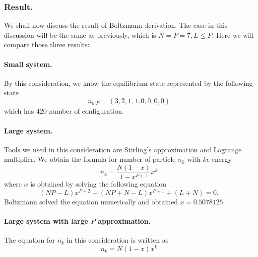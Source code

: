 \documentclass[../../../Main.tex]{subfiles}
\begin{document}
\subsubsection*{Result.} We shall now discuss the result of Boltzmann derivation. The case in this discussion will be the same as previously, which is $N = P = 7 , L \leq P$. Here we will compare those three results: 

\paragraph*{Small system.} By this consideration, we know the equilibrium state represented by the following state \begin{equation*}
    n_{k|P}=(3, 2, 1, 1, 0, 0, 0, 0)
\end{equation*} which has 420 number of configuration.

\paragraph*{Large system.} Tools we used in this consideration are Stirling's approximation and Lagrange multiplier. We obtain the formula for number of particle $n_k$ with $k\epsilon$ energy \begin{equation*}
    n_k=\frac{N(1-x)}{1-x^{P+1}}x^k
\end{equation*}
where $x$ is obtained by solving the following equation
\begin{equation*}
    (N P - L)x^{P+2} - (NP + N - L)x^{P+1} + (L + N ) = 0.
\end{equation*}
Boltzmann solved the equation numerically and obtained $x=0.5078125$.

\paragraph*{Large system with large $P$ approximation.} The equation for $n_k$ in this consideration is written as \begin{equation*}
    n_k= N (1 - x)x^k 
\end{equation*}
\end{document}

